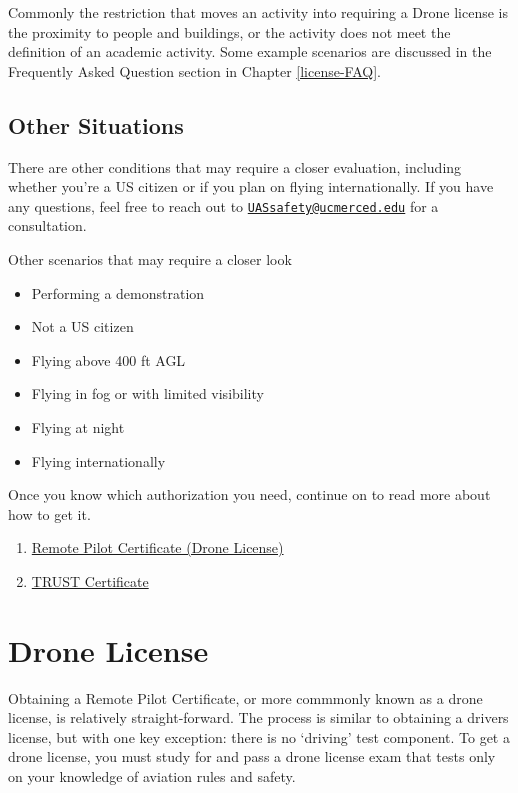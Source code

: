 \documentclass[
  12pt,
]{book}
\providecommand{\tightlist}{%
  \setlength{\itemsep}{0pt}\setlength{\parskip}{0pt}}
\newenvironment{notebox}{
  \definecolor{shadecolor}{gray}{.8}  %
  \color{black}
  \begin{shaded}}
 {\end{shaded}}
\begin{document}
\begin{notebox}
Commonly the restriction that moves an activity into requiring a Drone license is the proximity to people and buildings, or the activity does not meet the definition of an academic activity. Some example scenarios are discussed in the Frequently Asked Question section in Chapter \ref{license-FAQ}.

\end{notebox}

\subsection{Other Situations}\label{other-situations}

There are other conditions that may require a closer evaluation, including whether you're a US citizen or if you plan on flying internationally. If you have any questions, feel free to reach out to \href{mailto:UASsafety@ucmerced.edu}{\nolinkurl{UASsafety@ucmerced.edu}} for a consultation.

Other scenarios that may require a closer look

\begin{itemize}
\tightlist
\item
  Performing a demonstration
\item
  Not a US citizen
\item
  Flying above 400 ft AGL
\item
  Flying in fog or with limited visibility
\item
  Flying at night
\item
  Flying internationally
\end{itemize}

Once you know which authorization you need, continue on to read more about how to get it.

\begin{enumerate}
\def\labelenumi{\arabic{enumi}.}
\tightlist
\item
  \hyperref[get-license]{Remote Pilot Certificate (Drone License)}
\item
  \hyperref[TRUST]{TRUST Certificate}
\end{enumerate}

\section{Drone License}\label{get-license}

Obtaining a Remote Pilot Certificate, or more commmonly known as a drone license, is relatively straight-forward. The process is similar to obtaining a drivers license, but with one key exception: there is no `driving' test component. To get a drone license, you must study for and pass a drone license exam that tests only on your knowledge of aviation rules and safety.
\end{document}

